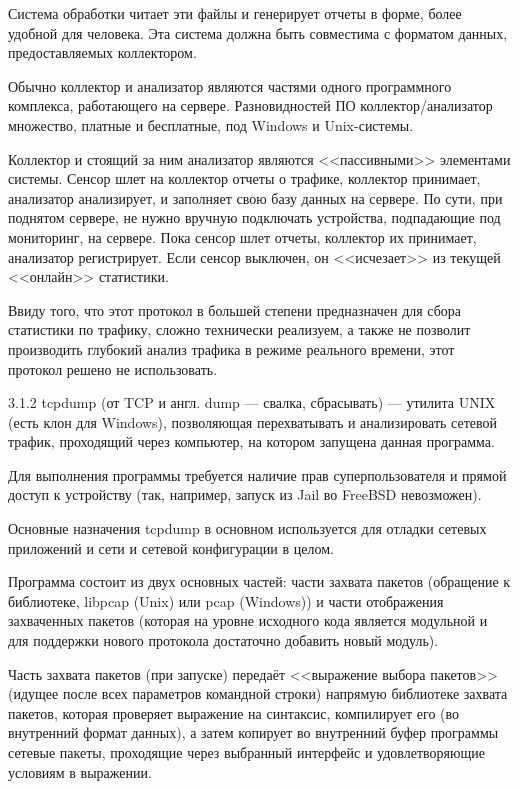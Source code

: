 Система обработки читает эти файлы и генерирует отчеты в форме, более удобной для человека. Эта система должна быть совместима с форматом данных, предоставляемых коллектором. \par 

Обычно коллектор и анализатор являются частями одного программного комплекса, работающего на сервере. Разновидностей ПО коллектор/анализатор множество, платные и бесплатные, под Windows и Unix-системы.\par 

Коллектор и стоящий за ним анализатор являются <<пассивными>> элементами системы. Сенсор шлет на коллектор отчеты о трафике, коллектор принимает, анализатор анализирует, и заполняет свою базу данных на сервере. По сути, при поднятом сервере, не нужно вручную подключать устройства, подпадающие под мониторинг, на сервере. Пока сенсор шлет отчеты, коллектор их принимает, анализатор регистрирует. Если сенсор выключен, он <<исчезает>> из текущей <<онлайн>> статистики.\par

Ввиду того, что этот протокол в большей степени предназначен для сбора статистики по трафику, сложно технически реализуем, а также не позволит производить глубокий анализ трафика в режиме реального времени, этот протокол решено не использовать.\par

3.1.2  tcpdump (от TCP и англ. dump --- свалка, сбрасывать) --- утилита UNIX (есть клон для Windows), позволяющая перехватывать и анализировать сетевой трафик, проходящий через компьютер, на котором запущена данная программа.\par 

Для выполнения программы требуется наличие прав суперпользователя и прямой доступ к устройству (так, например, запуск из Jail во FreeBSD невозможен).\par 

Основные назначения tcpdump в основном используется для отладки сетевых приложений и сети и сетевой конфигурации в целом.\par  

Программа состоит из двух основных частей: части захвата пакетов (обращение к библиотеке, libpcap (Unix) или pcap (Windows)) и части отображения захваченных пакетов (которая на уровне исходного кода является модульной и для поддержки нового протокола достаточно добавить новый модуль).\par 

Часть захвата пакетов (при запуске) передаёт <<выражение выбора пакетов>> (идущее после всех параметров командной строки) напрямую библиотеке захвата пакетов, которая проверяет выражение на синтаксис, компилирует его (во внутренний формат данных), а затем копирует во внутренний буфер программы сетевые пакеты, проходящие через выбранный интерфейс и удовлетворяющие условиям в выражении.\par 

